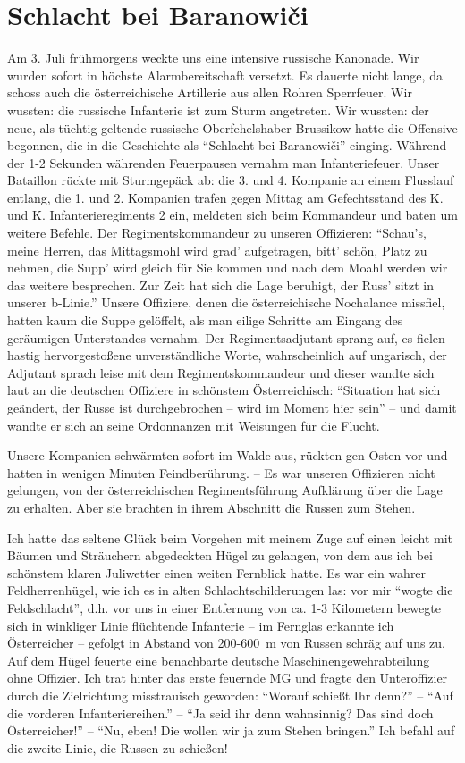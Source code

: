 \section{Schlacht bei Baranowiči}
Am 3. Juli frühmorgens weckte uns eine intensive russische Kanonade. Wir wurden sofort in höchste Alarmbereitschaft versetzt. Es dauerte nicht lange, da schoss auch die österreichische Artillerie aus allen Rohren Sperrfeuer. Wir wussten: die russische Infanterie ist zum Sturm angetreten. Wir wussten: der neue, als tüchtig geltende russische Oberfehelshaber Brussikow hatte die Offensive begonnen, die in die Geschichte als \enquote{Schlacht bei Baranowiči} einging. Während der 1-2 Sekunden währenden Feuerpausen vernahm man Infanteriefeuer. Unser Bataillon rückte mit Sturmgepäck ab: die 3. und 4. Kompanie an einem Flusslauf entlang, die 1. und 2. Kompanien trafen gegen Mittag am Gefechtsstand des K. und K. Infanterieregiments 2 ein, meldeten sich beim Kommandeur und baten um weitere Befehle. Der Regimentskommandeur zu unseren Offizieren: \enquote{Schau's, meine Herren, das Mittagsmohl wird grad' aufgetragen, bitt' schön, Platz zu nehmen, die Supp' wird gleich für Sie kommen und nach dem Moahl werden wir das weitere besprechen. Zur Zeit hat sich die Lage beruhigt, der Russ' sitzt in unserer b-Linie.} Unsere Offiziere, denen die österreichische Nochalance missfiel, hatten kaum die Suppe gelöffelt, als man eilige Schritte am Eingang des geräumigen Unterstandes vernahm. Der Regimentsadjutant sprang auf, es fielen hastig hervorgestoßene unverständliche Worte, wahrscheinlich auf ungarisch, der Adjutant sprach leise mit dem Regimentskommandeur und dieser wandte sich laut an die deutschen Offiziere in schönstem Österreichisch: \enquote{Situation hat sich geändert, der Russe ist durchgebrochen -- wird im Moment hier sein} -- und damit wandte er sich an seine Ordonnanzen mit Weisungen für die Flucht.

Unsere Kompanien schwärmten sofort im Walde aus, rückten gen Osten vor und hatten in wenigen Minuten Feindberührung. -- Es war unseren Offizieren nicht gelungen, von der österreichischen Regimentsführung Aufklärung über die Lage zu erhalten. Aber sie brachten in ihrem Abschnitt die Russen zum Stehen.

Ich hatte das seltene Glück beim Vorgehen mit meinem Zuge auf einen leicht mit Bäumen und Sträuchern abgedeckten Hügel zu gelangen, von dem aus ich bei schönstem klaren Juliwetter einen weiten Fernblick hatte. Es war ein wahrer Feldherrenhügel, wie ich es in alten Schlachtschilderungen las: vor mir \enquote{wogte die Feldschlacht}, d.h. vor uns in einer Entfernung von ca. 1-3 Kilometern bewegte sich in winkliger Linie flüchtende Infanterie -- im Fernglas erkannte ich Österreicher -- gefolgt in Abstand von 200-600~m von Russen schräg auf uns zu. Auf dem Hügel feuerte eine benachbarte deutsche Maschinengewehrabteilung ohne Offizier. Ich trat hinter das erste feuernde MG und fragte den Unteroffizier durch die Zielrichtung misstrauisch geworden: \enquote{Worauf schießt Ihr denn?} -- \enquote{Auf die vorderen Infanteriereihen.} -- \enquote{Ja seid ihr denn wahnsinnig? Das sind doch Österreicher!} -- \enquote{Nu, eben! Die wollen wir ja zum Stehen bringen.} Ich befahl auf die zweite Linie, die Russen zu schießen!

